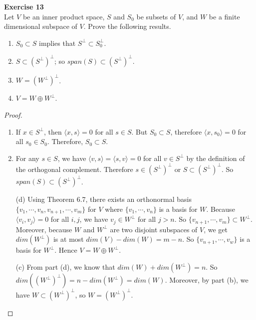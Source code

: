 \documentclass[12pt, a4paper]{article}
\theoremstyle{plain}
\newenvironment{exercise}[2][Exercise]
    { \begin{mdframed}[backgroundcolor=gray!20] \textbf{#1 #2} \\}
    {  \end{mdframed}}
\begin{document}
\begin{exercise}{13}
Let $V$ be an inner product space, $S$ and $S_0$ be subsets of $V$, and $W$ be a finite dimensional subspace of $V$. Prove the following results.
\begin{enumerate}[label=(\alph*)]
\item $S_0\subset S$ implies that $S^\perp\subset S_0^\perp$.
\item $S\subset (S^\perp)^\perp$; so $span(S)\subset (S^\perp)^\perp$.
\item $W=(W^\perp)^\perp$.
\item $V=W\oplus W^\perp$.
\end{enumerate}
\end{exercise}
	\begin{proof}
	\hfill
	\begin{enumerate}[label=(\alph*)]
	\item If $x\in S^\perp$, then $\langle{x,s}\rangle=0$ for all $s\in S$. But $S_0\subset S$, therefore $\langle{x,s_0}\rangle =0$ for all $s_0\in S_0$. Therefore, $S_0\subset S$.
	
 	\item For any $s\in S$, we have $\langle{v,s}\rangle =\langle{s,v}\rangle =0$ for all $v\in S^\perp$ by the definition of the orthogonal complement. Therefore $s\in (S^\perp)^\perp$ or $S\subset (S^\perp)^\perp$. So $span(S)\subset (S^\perp)^\perp$.
 	
 	\item[(d)] Using Theorem 6.7, there exists an orthonormal basis $\{v_1,\cdots,v_n,v_{n+1},\cdots,v_m\}$ for $V$ where $\{v_1,\cdots,v_n\}$ is a basis for $W$. Because $\langle{v_i,v_j}\rangle =0$ for all $i,j$, we have $v_j\in W^\perp$ for all $j> n$. So $\{v_{n+1},\cdots,v_m\}\subset W^\perp$. Moreover, because $W$ and $W^\perp$ are two disjoint subspaces of $V$, we get $dim(W^\perp)$ is at most $dim(V)-dim(W)=m-n$. So $\{v_{n+1},\cdots,v_w\}$ is a basis for $W^\perp$. Hence $V=W\oplus W^\perp$.
 	
 	\item[(c)] From part (d), we know that $dim(W)+dim(W^\perp)=n$. So $dim((W^\perp)^\perp)=n-dim(W^\perp)=dim(W)$. Moreover, by part (b), we have $W\subset (W^\perp)^\perp$, so $W=(W^\perp)^\perp$.
	\end{enumerate}
	\end{proof}
\end{document}

